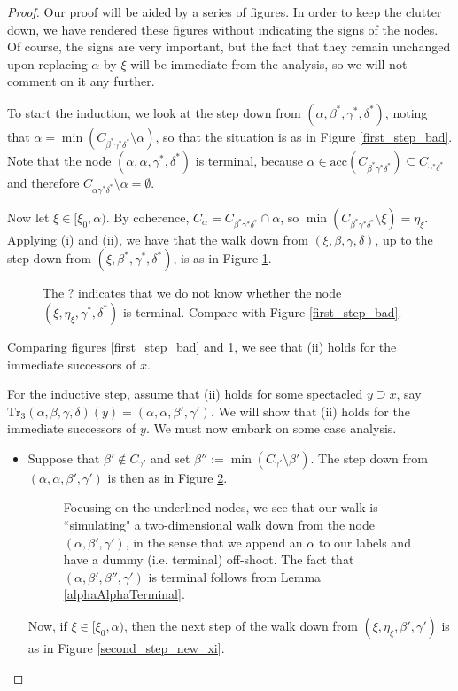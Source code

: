 \documentclass{amsart}
\numberwithin{theorem}{section}
\theoremstyle{definition}
\renewcommand{\subset}{\subseteq}
\newcommand{\acc}{\mathrm{acc}}
\newcommand{\Tr}{\mathrm{Tr}}
\begin{document}
\begin{proof}
Our proof will be aided by a series of figures. In order to keep the clutter down, we have rendered these figures without indicating the signs of the nodes. Of course, the signs are very important, but the fact that they remain unchanged upon replacing $\alpha$ by $\xi$ will be immediate from the analysis, so we will not comment on it any further.

To start the induction, we look at the step down from $(\alpha,\beta^*,\gamma^*,\delta^*)$, noting that $\alpha=\min(C_{\beta^*\gamma^*\delta^*}\setminus\alpha)$, so that the situation is as in Figure \ref{first_step_bad}. Note that the node $(\alpha,\alpha,\gamma^*,\delta^*)$ is terminal, because $\alpha\in \acc(C_{\beta^*\gamma^*\delta^*})\subset C_{\gamma^*\delta^*}$ and therefore $C_{\alpha\gamma^*\delta^*}\setminus\alpha=\emptyset$.

Now let $\xi\in [\xi_0,\alpha)$. By coherence, $C_\alpha=C_{\beta^*\gamma^*\delta^*}\cap\alpha$, so $\min(C_{\beta^*\gamma^*\delta^*}\setminus \xi)=\eta_\xi$. Applying (i) and (ii), we have that the walk down from $(\xi,\beta,\gamma,\delta)$, up to the step down from $(\xi,\beta^*,\gamma^*,\delta^*)$, is as in Figure \ref{first_step_bad_xi}.

\begin{figure}[ht]
\caption{The ? indicates that we do not know whether the node $(\xi,\eta_\xi,\gamma^*,\delta^*)$ is terminal. Compare with Figure \ref{first_step_bad}.}
\label{first_step_bad_xi}
\end{figure}

Comparing figures \ref{first_step_bad} and \ref{first_step_bad_xi}, we see that (ii) holds for 
the immediate successors of $x$.

For the inductive step, assume that (ii) holds for some spectacled $y\supseteq x$, say $\Tr_3(\alpha,\beta,\gamma,\delta)(y)=(\alpha,\alpha,\beta',\gamma')$. We will show that (ii) holds for the immediate successors of $y$. We must now embark on some case analysis. 

\begin{itemize}
\item Suppose that $\beta'\not\in C_{\gamma'}$ and set $\beta'':=\min(C_{\gamma'}\setminus \beta')$. The step down from $(\alpha,\alpha,\beta',\gamma')$ is then as in Figure \ref{second_step_new}.

\begin{figure}[ht]
\caption{Focusing on the underlined nodes, we see that our walk is ``simulating" a two-dimensional walk down from the node $(\alpha,\beta',\gamma')$, in the sense that we append an $\alpha$ to our labels and have a dummy (i.e. terminal) off-shoot. The fact that $(\alpha,\beta',\beta'',\gamma')$ is terminal follows from Lemma \ref{alphaAlphaTerminal}.}
\label{second_step_new}
\end{figure}
Now, if $\xi\in [\xi_0,\alpha)$, then the next step of the walk down from $(\xi,\eta_\xi,\beta',\gamma')$ is as in Figure \ref{second_step_new_xi}.


\end{itemize}
\end{proof}
\end{document}

